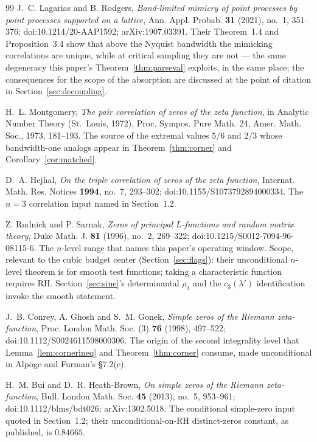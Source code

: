 \documentclass[11pt]{article}
\theoremstyle{plain}
\theoremstyle{definition}
\theoremstyle{remark}
\begin{document}
\begin{thebibliography}{99}
 J.~C. Lagarias and B. Rodgers, \emph{Band-limited mimicry
of point processes by point processes supported on a lattice}, Ann. Appl.
Probab. \textbf{31} (2021), no.~1, 351--376; doi:10.1214/20-AAP1592;
arXiv:1907.03391. Their Theorem~1.4 and Proposition~3.4 show that above the
Nyquist bandwidth the mimicking correlations are unique, while at
critical sampling they are not --- the same degeneracy this paper's
Theorem~\ref{thm:parseval} exploits, in the same place; the consequences for the
scope of the absorption are discussed at the point of citation in
Section~\ref{sec:decoupling}.

 H.~L. Montgomery, \emph{The pair correlation of zeros of
the zeta function}, in Analytic Number Theory (St.~Louis, 1972), Proc. Sympos.
Pure Math. 24, Amer. Math. Soc., 1973, 181--193. The source of the extremal
values $5/6$ and $2/3$ whose bandwidth-one analogs appear in
Theorem~\ref{thm:corner} and Corollary~\ref{cor:matched}.

 D.~A. Hejhal, \emph{On the triple correlation of zeros of
the zeta function}, Internat. Math. Res. Notices \textbf{1994}, no.~7,
293--302; doi:10.1155/S1073792894000334. The $n = 3$ correlation input named in
Section~1.2.

 Z. Rudnick and P. Sarnak, \emph{Zeros of principal
$L$-functions and random matrix theory}, Duke Math. J. \textbf{81} (1996),
no.~2, 269--322; doi:10.1215/S0012-7094-96-08115-6. The $n$-level range that
names this
paper's operating window. Scope, relevant to the cubic budget center
(Section~\ref{sec:flags}): their unconditional $n$-level theorem is for smooth
test functions; taking a characteristic function requires RH.
Section~\ref{sec:sine}'s determinantal $\rho_3$ and the $c_3(\lambda')$
identification invoke the smooth statement.

 J.~B. Conrey, A. Ghosh and S.~M. Gonek, \emph{Simple
zeros of the Riemann zeta-function}, Proc. London Math. Soc. (3) \textbf{76}
(1998), 497--522; doi:10.1112/S0024611598000306. The origin of the second
integrality level that
Lemma~\ref{lem:cornerineq} and Theorem~\ref{thm:corner} consume, made
unconditional in Alp\"oge and Furman's \S7.2(c).

 H.~M. Bui and D.~R. Heath-Brown, \emph{On simple zeros of
the Riemann zeta-function}, Bull. London Math. Soc. \textbf{45} (2013),
no.~5, 953--961; doi:10.1112/blms/bdt026; arXiv:1302.5018. The conditional
simple-zero input quoted in Section~1.2; their unconditional-on-RH
distinct-zeros constant, as published, is $0.84665$.


\end{thebibliography}
\end{document}
